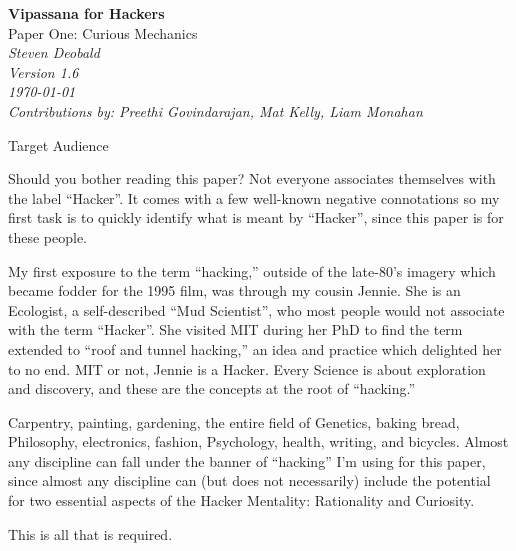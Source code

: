 \documentclass{article}
\begin{document}
\begin{titlepage}
   \begin{center}
     \Huge\textbf{Vipassana for Hackers}\\
     \Huge{Paper One: Curious Mechanics}\\
     \vspace{5cm}
     \large\textit{Steven Deobald}\\
     \large\textit{Version 1.6}\\
     \large\textit\today\\
     \vspace{5cm}
     \large\textit{Contributions by: Preethi Govindarajan, Mat Kelly, Liam Monahan}\\
   \end{center}
\end{titlepage}

\begin{center}
  \Huge{Target Audience}
\end{center}

Should you bother reading this paper? Not everyone associates themselves with the label ``Hacker''. It comes with a few well-known negative connotations so my first task is to quickly identify what is meant by ``Hacker'', since this paper is for these people.

My first exposure to the term ``hacking,'' outside of the late-80's imagery which became fodder for the 1995 film, was through my cousin Jennie. She is an Ecologist, a self-described ``Mud Scientist'', who most people would not associate with the term ``Hacker''. She visited MIT during her PhD to find the term extended to ``roof and tunnel hacking,'' an idea and practice which delighted her to no end. MIT or not, Jennie is a Hacker. Every Science is about exploration and discovery, and these are the concepts at the root of ``hacking.''

Carpentry, painting, gardening, the entire field of Genetics, baking bread, Philosophy, electronics, fashion, Psychology, health, writing, and bicycles. Almost any discipline can fall under the banner of ``hacking'' I'm using for this paper, since almost any discipline can (but does not necessarily) include the potential for two essential aspects of the Hacker Mentality: Rationality and Curiosity.

This is all that is required.
\end{document}
